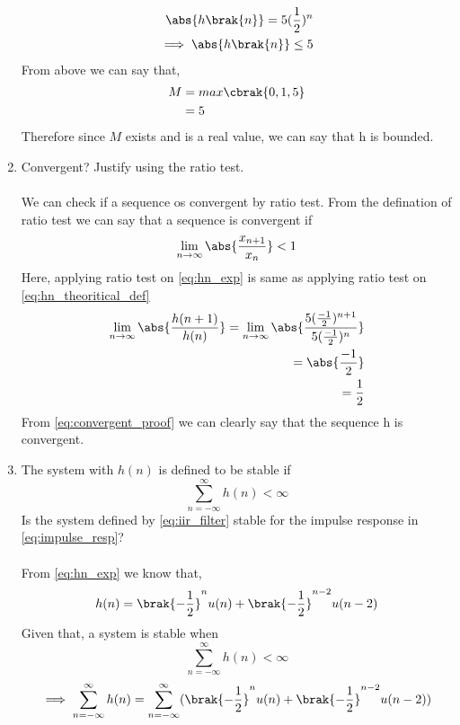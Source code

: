 \documentclass[journal,12pt,twocolumn]{IEEEtran}
\renewcommand\thesection{\arabic{section}}
\begin{document}
\begin{enumerate}[label=\thesection.\arabic*]
\begin{align}
	\abs{h\brak{n}} = 5(\frac{1}{2})^n\\
	\implies \abs{h\brak{n}} \leq 5
\end{align}
From above we can say that,
      \begin{align}
        M &= max\cbrak{0,1,5} \\
          &= 5\label{eq:hn_bounded_proof}
      \end{align}
Therefore since $M$ exists and is a real value, we can say that h is bounded.
\item Convergent? Justify using the ratio test.\\
\solution\\
We can check if a sequence os convergent by ratio test. From the defination of ratio test we can say that a sequence is convergent if 
\begin{equation}
	\lim_{n \rightarrow \infty}\abs{\frac{x_{n+1}}{x_n}} < 1
\end{equation}
Here, applying ratio test on \eqref{eq:hn_exp} is same as applying ratio test on \eqref{eq:hn_theoritical_def}
\begin{align}
	\lim_{n \rightarrow \infty}\abs{\frac{h(n+1)}{h(n)}} = \lim_{n \rightarrow \infty}\abs{\frac{5(\frac{-1}{2})^{n+1}}{5(\frac{-1}{2})^{n}}}
	\\= \abs{\frac{-1}{2}}
	\\= \frac{1}{2}\label{eq:convergent_proof}
\end{align}
From \eqref{eq:convergent_proof} we can clearly say that the sequence h is convergent.
\item The system with $h(n)$ is defined to be stable if
\begin{equation}
\sum_{n=-\infty}^{\infty}h(n) < \infty
\end{equation}
Is the system defined by \eqref{eq:iir_filter} stable for the impulse response in \eqref{eq:impulse_resp}?
\\\solution\\
From \eqref{eq:hn_exp} we know that,
\begin{equation}
	h(n) = \brak{-\frac{1}{2}}^{n}u(n) + \brak{-\frac{1}{2}}^{n-2}u(n-2)
\end{equation}
Given that, a system is stable when 
\begin{equation}
	\sum_{n=-\infty}^{\infty}h(n) < \infty
\end{equation}
\begin{align}
	\implies \sum_{n=-\infty}^{\infty}h(n) = \sum_{n=-\infty}^{\infty} (\brak{-\frac{1}{2}}^{n}u(n) + \brak{-\frac{1}{2}}^{n-2}u(n-2))

\end{align}
\end{enumerate}
\end{document}

